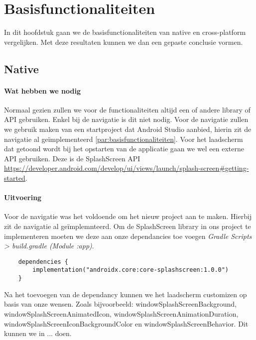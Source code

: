 
\chapter{Basisfunctionaliteiten}%
\label{ch:basisfunctionaliteiten}

In dit hoofdstuk gaan we de basisfunctionaliteiten van native en cross-platform vergelijken. 
Met deze resultaten kunnen we dan een gepaste conclusie vormen.

\section{Native}
\subsubsection{Wat hebben we nodig}
Normaal gezien zullen we voor de functionaliteiten altijd een of andere library of API gebruiken. Enkel bij de navigatie is dit niet nodig. 
Voor de navigatie zullen we gebruik maken van een startproject dat Android Studio aanbied, hierin zit de navigatie al geïmplementeerd 
\ref{par:basisfunctionaliteiten}. Voor het laadscherm dat getoond wordt bij het opstarten van de applicatie gaan we wel een externe API gebruiken. 
Deze is de SplashScreen API \url{https://developer.android.com/develop/ui/views/launch/splash-screen#getting-started}.

\subsubsection{Uitvoering}
Voor de navigatie was het voldoende om het nieuw project aan te maken. Hierbij zit de navigatie al geïmplemnteerd.
Om de SplashScreen library in ons project te implementeren moeten we deze aan onze dependancies toe voegen 
\textit{Gradle Scripts > build.gradle (Module :app)}.
\begin{verbatim}
    dependencies {
        implementation("androidx.core:core-splashscreen:1.0.0")
    }
\end{verbatim}
Na het toevoegen van de dependancy kunnen we het laadscherm customizen op basis van onze wensen. Zoals bijvoorbeeld: 
windowSplashScreenBackground, windowSplashScreenAnimatedIcon, windowSplashScreenAnimationDuration, 
windowSplashScreenIconBackgroundColor en windowSplashScreenBehavior. Dit kunnen we in ... doen.

